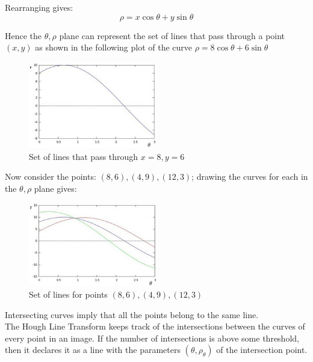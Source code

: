 \documentclass{article}
\theoremstyle{definition}
\theoremstyle{remark}
\begin{document}
\noindent Rearranging gives:
\begin{equation*}
\rho = x \cos\theta + y\sin\theta 
\end{equation*}

\noindent Hence the $ \theta, \rho $ plane can represent the set of lines that pass through a point $ (x, y) $ as shown in the following plot of the curve $ \rho = 8\cos\theta + 6\sin\theta $

\begin{figure}[H]
    \centering
    \includegraphics[width=0.5\textwidth]{hough_line}
    \caption{Set of lines that pass through $ x=8, y=6 $}
    \label{fig:hough_line}
\end{figure}

\noindent Now consider the points: $ (8,6), (4,9), (12, 3) $; drawing the curves for each in the $ \theta, \rho $ plane gives:

\begin{figure}[h!]
    \centering
    \includegraphics[width=0.5\textwidth]{hough_line_mult}
    \caption{Set of lines for points $ (8,6), (4,9), (12, 3) $}
    \label{fig:hough_line_mult}
\end{figure}

\noindent Intersecting curves imply that all the points belong to the same line.\\

The Hough Line Transform keeps track of the intersections between the curves of every point in an image. If the number of intersections is above some threshold, then it declares it as a line with the parameters $ (\theta, \rho_{\theta}) $ of the intersection point.
\end{document}
